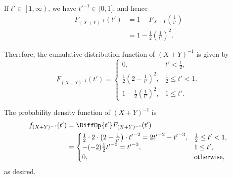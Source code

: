 \begin{enumerate}
          If \(t' \in \left[1, \infty\right)\), we have \(t'^{-1} \in (0, 1]\), and hence
          \begin{align*}
              F_{(X + Y)^{-1}}(t') & = 1 - F_{X + Y}\left(\frac{1}{t'}\right)       \\
                                   & = 1 - \frac{1}{2} \left(\frac{1}{t'}\right)^2.
          \end{align*}

          Therefore, the cumulative distribution function of \((X + Y)^{-1}\) is given by
          \[
              F_{(X + Y)^{-1}}(t') = \begin{cases}
                  0,                                           & t' < \frac{1}{2},        \\
                  \frac{1}{2} \left(2 - \frac{1}{t'}\right)^2, & \frac{1}{2} \leq t' < 1, \\
                  1 - \frac{1}{2} \left(\frac{1}{t'}\right)^2, & 1 \leq t'.
              \end{cases}
          \]

          The probability density function of \((X + Y)^{-1}\) is
          \begin{align*}
              f_{(X + Y)^{-1}}(t') & = \DiffOp{t'} F_{(X + Y)^{-1}}(t')                                                                                              \\
                                   & = \begin{cases}
                                           \frac{1}{2} \cdot 2 \cdot \left(2 - \frac{1}{t'}\right) \cdot {t'}^{-2} = 2 {t'}^{-2} - {t'}^{-3}, & \frac{1}{2} \leq t' < 1, \\
                                           -(-2)\frac{1}{2} {t'}^{-3} = {t'}^{-3},                                                            & 1 \leq t',               \\
                                           0,                                                                                                 & \text{otherwise},
                                       \end{cases}
          \end{align*}
          as desired.


\end{enumerate}
